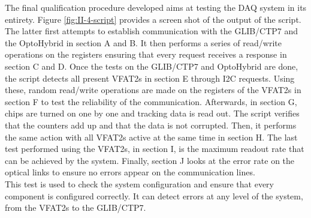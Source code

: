     The final qualification procedure developed aims at testing the DAQ system in its entirety. Figure \ref{fig:II-4-script} provides a screen shot of the output of the script. The latter first attempts to establish communication with the GLIB/CTP7 and the OptoHybrid in section A and B. It then performs a series of read/write operations on the registers ensuring that every request receives a response in section C and D. Once the tests on the GLIB/CTP7 and OptoHybrid are done, the script detects all present VFAT2s in section E through I2C requests. Using these, random read/write operations are made on the registers of the VFAT2s in section F to test the reliability of the communication. Afterwards, in section G, chips are turned on one by one and tracking data is read out. The script verifies that the counters add up and that the data is not corrupted. Then, it performs the same action with all VFAT2s active at the same time in section H. The last test performed using the VFAT2s, in section I, is the maximum readout rate that can be achieved by the system. Finally, section J looks at the error rate on the optical links to ensure no errors appear on the communication lines. \\

    This test is used to check the system configuration and ensure that every component is configured correctly. It can detect errors at any level of the system, from the VFAT2s to the GLIB/CTP7.

